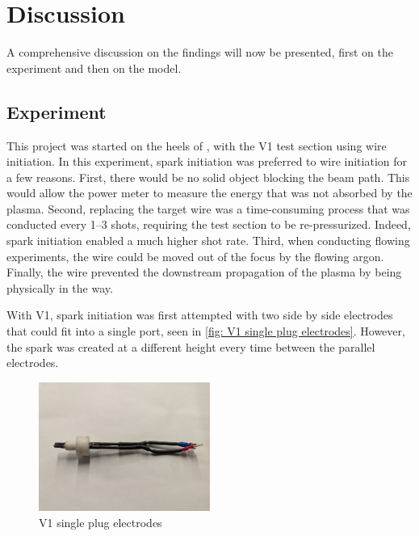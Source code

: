 \chapter{Discussion}\label{chp:discussion}

A comprehensive discussion on the findings will now be presented, first on the experiment and then on the model.

\section{Experiment}
This project was started on the heels of \textcite{duplayArgonLaserPlasmaThruster2024a}, with the V1 test section using wire initiation. In this experiment, spark initiation was preferred to wire initiation for a few reasons. First, there would be no solid object blocking the beam path. This would allow the power meter to measure the energy that was not absorbed by the plasma. Second, replacing the target wire was a time-consuming process that was conducted every 1–3 shots, requiring the test section to be re-pressurized. Indeed, spark initiation enabled a much higher shot rate. Third, when conducting flowing experiments, the wire could be moved out of the focus by the flowing argon. Finally, the wire prevented the downstream propagation of the plasma by being physically in the way.

With V1, spark initiation was first attempted with two side by side electrodes that could fit into a single port, seen in \autoref{fig: V1 single plug electrodes}. However, the spark was created at a different height every time between the parallel electrodes.

\begin{figure}[!ht]
    \centering
    \includegraphics[width=0.5\textwidth]{assets/5 discussion/V1 single plug electrode.jpg}
    \caption{V1 single plug electrodes}
    \label{fig: V1 single plug electrodes}
\end{figure}

